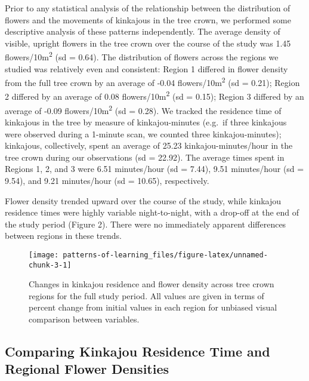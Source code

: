 \documentclass[twoside,12pt,final]{ucthesis-CA2012}
\begin{document}
\begin{ucmainmatter}
Prior to any statistical analysis of the relationship between the distribution of flowers and the movements of kinkajous in the tree crown, we performed some descriptive analysis of these patterns independently. The average density of visible, upright flowers in the tree crown over the course of the study was 1.45 flowers/10m\textsuperscript{2} (sd = 0.64). The distribution of flowers across the regions we studied was relatively even and consistent: Region 1 differed in flower density from the full tree crown by an average of -0.04 flowers/10m\textsuperscript{2} (sd = 0.21); Region 2 differed by an average of 0.08 flowers/10m\textsuperscript{2} (sd = 0.15); Region 3 differed by an average of -0.09 flowers/10m\textsuperscript{2} (sd = 0.28). We tracked the residence time of kinkajous in the tree by measure of kinkajou-minutes (e.g.~if three kinkajous were observed during a 1-minute scan, we counted three kinkajou-minutes); kinkajous, collectively, spent an average of 25.23 kinkajou-minutes/hour in the tree crown during our observations (sd = 22.92). The average times spent in Regions 1, 2, and 3 were 6.51 minutes/hour (sd = 7.44), 9.51 minutes/hour (sd = 9.54), and 9.21 minutes/hour (sd = 10.65), respectively.

Flower density trended upward over the course of the study, while kinkajou residence times were highly variable night-to-night, with a drop-off at the end of the study period (Figure 2). There were no immediately apparent differences between regions in these trends.
\begin{figure}
\texttt{[image: patterns-of-learning\_files/figure-latex/unnamed-chunk-3-1]} \caption[Changes in kinkajou residence and flower density.]{Changes in kinkajou residence and flower density across tree crown regions for the full study period. All values are given in terms of percent change from initial values in each region for unbiased visual comparison between variables.}\label{fig:unnamed-chunk-3}
\end{figure}
\hypertarget{comparing-kinkajou-residence-time-and-regional-flower-densities-1}{%
\subsection{Comparing Kinkajou Residence Time and Regional Flower Densities}\label{comparing-kinkajou-residence-time-and-regional-flower-densities-1}}


\end{ucmainmatter}
\end{document}
